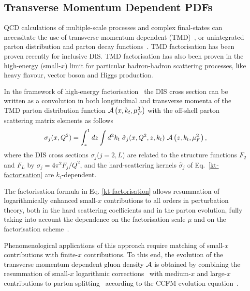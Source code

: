 \subsection{Transverse Momentum Dependent PDFs}


\def\kt{\ensuremath{k_t}}
\def\pt{\ensuremath{p_t}}


QCD calculations of multiple-scale processes  and complex final-states
can necessitate the use of transverse-momentum dependent (TMD)~\cite{Collins:2011zzd}, or 
unintegrated parton distribution and parton decay 
functions~\cite{Aybat:2011zv,Buffing:2013eka,Buffing:2013kca,Buffing:2012sz,Mulders:2008tf,Jadach:2009gm,Hautmann:2009zzb,Hautmann:2012pf,Hautmann:2007gw}.   
TMD factorisation has been proven recently \cite{Collins:2011zzd} for inclusive DIS. TMD factorisation has also been proven in the high-energy (small-$x$) limit \cite{Catani:1990xk,Collins:1991ty,Hautmann:2002tu} for 
particular hadron-hadron scattering processes, like heavy flavour, vector boson and Higgs production.
  
In the framework of high-energy factorisation~\cite{Catani:1990xk,Catani:1990eg,Catani:1993ww} 
the DIS cross section can be written as a convolution in 
both longitudinal and transverse momenta of the TMD parton distribution function 
${\cal A}\left(x,\kt,\mu_{F}^2\right)$    
 with the off-shell parton scattering matrix elements as follows 
\begin{equation}
 \sigma_j (x, Q^2) = \int_x^1  
d z \int d^2k_t \ 
\hat{\sigma}_j(x,Q^2,{z},k_t) \ 
 {\cal  A}\left( {z} ,\kt, \mu_{F}^2 \right), 
\label{kt-factorisation}
\end{equation}
where  the DIS cross sections 
$\sigma_j$($j= 2 , L$) 
are related to the  structure functions $F_2$ and $F_L$ 
by 
$\sigma_j = 4 \pi^2 F_j / Q^2$, and   
the hard-scattering kernels ${\hat \sigma}_j$ of Eq.~\ref{kt-factorisation}
are $k_t$-dependent. 

The factorisation formula in Eq. \ref{kt-factorisation}
allows resummation of   
logarithmically enhanced small-$ x  $ contributions  
 to all orders in perturbation theory,  
both in the  hard 
scattering coefficients and 
in  the parton evolution, fully taking into account the 
dependence on the factorisation scale $\mu$ and on the 
factorisation scheme~\cite{Catani:1994sq,Catani:1993rn}.  


Phenomenological applications of this approach require 
matching of small-$ x  $ contributions with  finite-$x$ contributions.  To this end, 
the evolution  of the 
transverse momentum dependent gluon density 
${\cal  A} $ is obtained  by combining    the resummation of  small-$x$ logarithmic 
corrections~\cite{Lipatov:1996ts,Fadin:1975cb,Balitsky:1978ic,Balitsky:1978ic}   with   medium-$x$  and large-$x$ 
contributions to parton  splitting~\cite{Gribov:1972ri,Altarelli:1977zs,Dokshitzer:1977sg} according to the 
CCFM  evolution equation~\cite{Ciafaloni:1987ur,Catani:1989sg,Marchesini:1994wr}.



